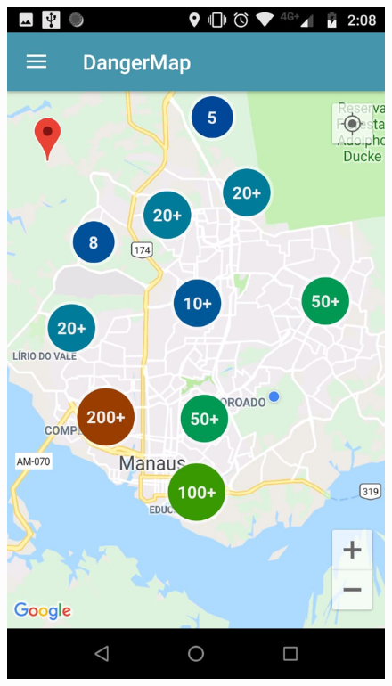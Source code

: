 \documentclass[
	12pt,				%
	openright,			%
	twoside,			%
	a4paper,			%
	english,			%
	french,				%
	spanish,			%
	brazil,				%
	]{abntex2}
\begin{document}
\begin{figure}[!htb]
{		\includegraphics[scale=0.19]{figuras/tela-clustermap.jpeg}
		\label{cluster_map}
	}
	\quad %
	\quad %
	\quad %
	\quad %
	\quad %
\end{figure}
\end{document}

